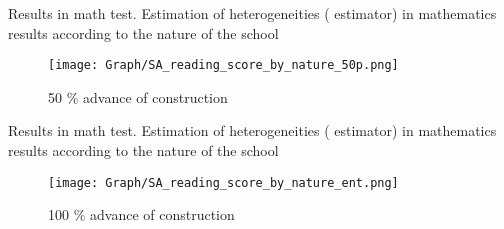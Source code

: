 \documentclass[9pt]{beamer}
\begin{document}
\begin{frame}{ Results in math test.  \hyperlink{result_math}{} }\label{50p_math_nat}
\small Estimation of heterogeneities (\cite{SUN2021175} estimator) in mathematics results according to the nature of the school  
\begin{figure}
  \centering
  \texttt{[image: Graph/SA\_reading\_score\_by\_nature\_50p.png]} 
  \caption{\small 50 \% advance of construction}
  \label{fig:6.1sub-first}
\end{figure}
\end{frame}

\begin{frame}{ Results in math test.  \hyperlink{result_math}{} }\label{100p_math_nat}
\small Estimation of heterogeneities (\cite{SUN2021175} estimator) in mathematics results according to the nature of the school  
\begin{figure}
  \centering
  \texttt{[image: Graph/SA\_reading\_score\_by\_nature\_ent.png]} 
  \caption{\small 100 \% advance of construction}
  \label{fig:6.1sub-first}
\end{figure}
\end{frame}


\end{document}
